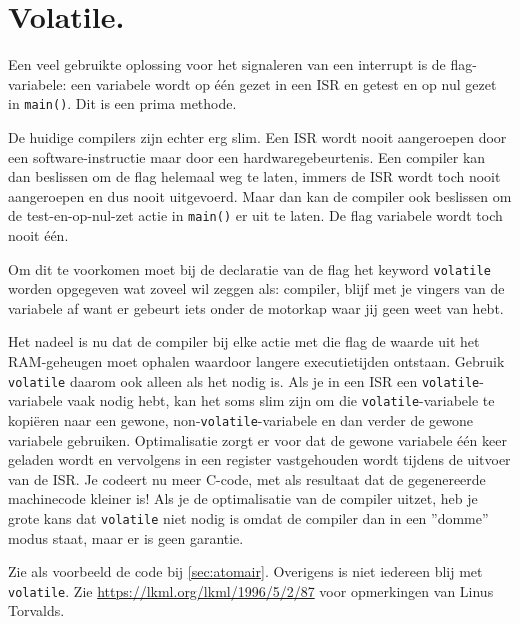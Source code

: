 \documentclass[12pt,a4paper,final,twoside,fleqn]{article}
\def\lstC{\lstinline[style=C]}
\begin{document}
\section{Volatile.}
Een veel gebruikte oplossing voor het signaleren van een interrupt is
de flag-variabele: een variabele wordt op \'{e}\'{e}n gezet in een ISR
en getest en op nul gezet in \lstC{main()}. Dit is een prima methode.

De huidige compilers zijn echter erg slim. Een ISR wordt nooit aangeroepen
door een software-instructie maar door een hardwaregebeurtenis. Een compiler
kan dan beslissen om de flag helemaal weg te laten, immers de ISR wordt toch
nooit aangeroepen en dus nooit uitgevoerd. Maar dan kan de compiler ook
beslissen om de test-en-op-nul-zet actie in \lstC{main()} er uit te laten.
De flag variabele wordt toch nooit \'{e}\'{e}n.

Om dit te voorkomen moet bij de declaratie van de flag het keyword
\lstC{volatile} worden opgegeven wat zoveel wil zeggen als: compiler, blijf
met je vingers van de variabele af want er gebeurt iets onder de motorkap
waar jij geen weet van hebt.

Het nadeel is nu dat de compiler bij elke actie
met die flag de waarde uit het RAM-geheugen moet ophalen waardoor langere
executietijden ontstaan. Gebruik \lstC{volatile} daarom ook alleen als het
nodig is. Als je in een ISR een \lstC{volatile}-variabele vaak nodig hebt,
kan het soms slim zijn om die \lstC{volatile}-variabele te kopi\"{e}ren
naar een gewone, non-\lstC{volatile}-variabele en dan verder de
gewone variabele gebruiken. Optimalisatie zorgt er voor dat de gewone
variabele \'{e}\'{e}n keer geladen wordt en vervolgens in een register
vastgehouden wordt tijdens de uitvoer van de ISR. Je codeert nu meer
C-code, met als resultaat dat de gegenereerde machinecode kleiner is!
Als je de optimalisatie van de compiler uitzet, heb je grote kans dat
\lstC{volatile} niet nodig is omdat de compiler dan in een ''domme'' modus
staat, maar er is geen garantie.

Zie als voorbeeld de code bij \ref{sec:atomair}. Overigens is niet iedereen
blij met \lstC{volatile}. Zie \url{https://lkml.org/lkml/1996/5/2/87} voor
opmerkingen van Linus Torvalds.
\end{document}
